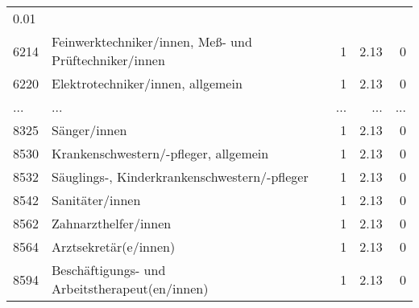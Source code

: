 \begin{longtable}{lXrrr}
          \num[round-mode=places,round-precision=2]{0.01} \\
        6214 & \multicolumn{1}{X}{Feinwerktechniker/innen, Meß- und Prüftechniker/innen} & %
          \num{1} &
          \num[round-mode=places,round-precision=2]{2.13} &
          \num[round-mode=places,round-precision=2]{0} \\
        6220 & \multicolumn{1}{X}{Elektrotechniker/innen, allgemein} & %
          \num{1} &
          \num[round-mode=places,round-precision=2]{2.13} &
          \num[round-mode=places,round-precision=2]{0} \\
       ... & ... & ... & ... & ... \\
        8325 & \multicolumn{1}{X}{Sänger/innen} & %
          \num{1} &
          \num[round-mode=places,round-precision=2]{2.13} &
          \num[round-mode=places,round-precision=2]{0} \\

        8530 & \multicolumn{1}{X}{Krankenschwestern/-pfleger, allgemein} & %
          \num{1} &
          \num[round-mode=places,round-precision=2]{2.13} &
          \num[round-mode=places,round-precision=2]{0} \\

        8532 & \multicolumn{1}{X}{Säuglings-, Kinderkrankenschwestern/-pfleger} & %
          \num{1} &
          \num[round-mode=places,round-precision=2]{2.13} &
          \num[round-mode=places,round-precision=2]{0} \\

        8542 & \multicolumn{1}{X}{Sanitäter/innen} & %
          \num{1} &
          \num[round-mode=places,round-precision=2]{2.13} &
          \num[round-mode=places,round-precision=2]{0} \\

        8562 & \multicolumn{1}{X}{Zahnarzthelfer/innen} & %
          \num{1} &
          \num[round-mode=places,round-precision=2]{2.13} &
          \num[round-mode=places,round-precision=2]{0} \\

        8564 & \multicolumn{1}{X}{Arztsekretär(e/innen)} & %
          \num{1} &
          \num[round-mode=places,round-precision=2]{2.13} &
          \num[round-mode=places,round-precision=2]{0} \\

        8594 & \multicolumn{1}{X}{Beschäftigungs- und Arbeitstherapeut(en/innen)} & %
          \num{1} &
          \num[round-mode=places,round-precision=2]{2.13} &
          \num[round-mode=places,round-precision=2]{0} \\


\end{longtable}
